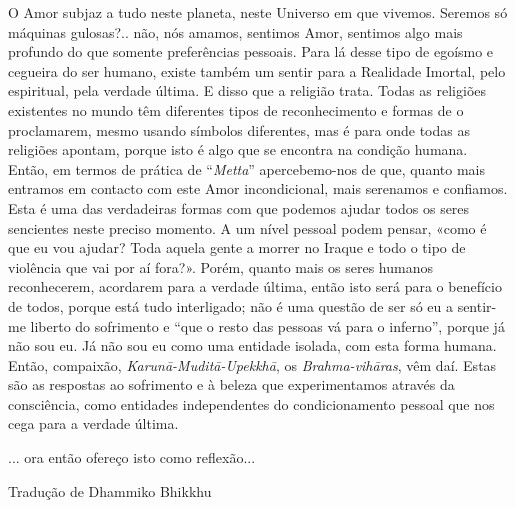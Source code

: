 O Amor subjaz a tudo neste planeta, neste Universo em que vivemos.
Seremos só máquinas gulosas?.. não, nós amamos, sentimos Amor, sentimos
algo mais profundo do que somente preferências pessoais. Para lá desse
tipo de egoísmo e cegueira do ser humano, existe também um sentir para a
Realidade Imortal, pelo espiritual, pela verdade última. E disso que a
religião trata. Todas as religiões existentes no mundo têm diferentes
tipos de reconhecimento e formas de o proclamarem, mesmo usando símbolos
diferentes, mas é para onde todas as religiões apontam, porque isto é
algo que se encontra na condição humana. Então, em termos de prática de
``\emph{Metta}'' apercebemo-nos de que, quanto mais entramos em contacto
com este Amor incondicional, mais serenamos e confiamos. Esta é uma das
verdadeiras formas com que podemos ajudar todos os seres sencientes
neste preciso momento. A um nível pessoal podem pensar, «como é que eu
vou ajudar? Toda aquela gente a morrer no Iraque e todo o tipo de
violência que vai por aí fora?». Porém, quanto mais os seres humanos
reconhecerem, acordarem para a verdade última, então isto será para o
benefício de todos, porque está tudo interligado; não é uma questão de
ser só eu a sentir-me liberto do sofrimento e ``que o resto das pessoas
vá para o inferno'', porque já não sou eu. Já não sou eu como uma
entidade isolada, com esta forma humana. Então, compaixão,
\emph{Karunā-Muditā-Upekkhā}, os \emph{Brahma-vihāras}, vêm daí. Estas
são as respostas ao sofrimento e à beleza que experimentamos através da
consciência, como entidades independentes do condicionamento pessoal que
nos cega para a verdade última.

... ora então ofereço isto como reflexão...

Tradução de Dhammiko Bhikkhu
